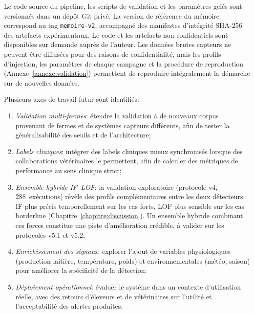 \begin{conclusion}
Le code source du pipeline, les scripts de validation et les paramètres gelés
sont versionnés dans un dépôt Git privé. La version de référence du mémoire
correspond au tag \texttt{memoire-v2}, accompagné des manifestes d'intégrité
SHA-256 des artefacts expérimentaux. Le code et les artefacts non confidentiels
sont disponibles sur demande auprès de l'auteur. Les données brutes capteurs
ne peuvent être diffusées pour des raisons de confidentialité, mais les profils
d'injection, les paramètres de chaque campagne et la procédure de reproduction
(Annexe~\ref{annexe:validation}) permettent de reproduire intégralement la
démarche sur de nouvelles données.

Plusieurs axes de travail futur sont identifiés:
\begin{enumerate}
  \item \textit{Validation multi-fermes}: étendre la validation à de nouveaux corpus
  provenant de fermes et de systèmes capteurs différents, afin de tester la
  généralisabilité des seuils et de l'architecture;
  \item \textit{Labels cliniques}: intégrer des labels cliniques mieux synchronisés lorsque
  des collaborations vétérinaires le permettent, afin de calculer des métriques de
  performance au sens clinique strict;
  \item \textit{Ensemble hybride IF--LOF}: la validation exploratoire (protocole v4,
  288~exécutions) révèle des profils complémentaires entre les deux détecteurs: IF plus précis
  temporellement sur les cas forts, LOF plus sensible sur les cas borderline
  (Chapitre~\ref{chapitre:discussion}). Un ensemble hybride combinant ces forces constitue
  une piste d'amélioration crédible, à valider sur les protocoles v5.1 et v5.2;
  \item \textit{Enrichissement des signaux}: explorer l'ajout de variables physiologiques
  (production laitière, température, poids) et environnementales (météo, saison) pour
  améliorer la spécificité de la détection;
  \item \textit{Déploiement opérationnel}: évaluer le système dans un contexte d'utilisation
  réelle, avec des retours d'éleveurs et de vétérinaires sur l'utilité et l'acceptabilité
  des alertes produites.
\end{enumerate}

\end{conclusion}
